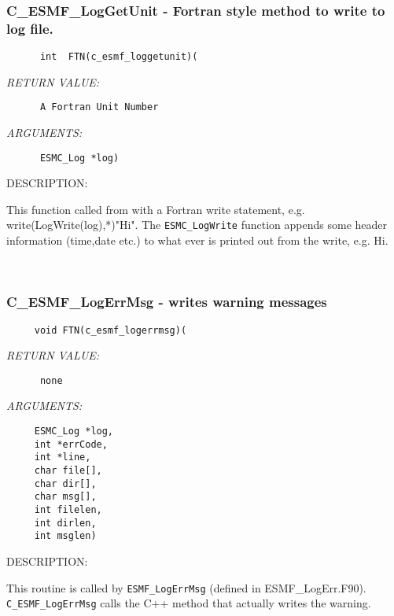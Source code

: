   \subsubsection [C\_ESMF\_LogGetUnit] {C\_ESMF\_LogGetUnit - Fortran style method to write to log file.}


  
\begin{verbatim}      int  FTN(c_esmf_loggetunit)(\end{verbatim}{\em RETURN VALUE:}
\begin{verbatim}      A Fortran Unit Number\end{verbatim}{\em ARGUMENTS:}
\begin{verbatim}      ESMC_Log *log)\end{verbatim}
{\sf DESCRIPTION:\\ }


      This function called from with a Fortran write statement, e.g.
      write(LogWrite(log),*)"Hi".  The {\tt ESMC\_LogWrite} function
      appends some
      header information (time,date etc.) to what ever is printed out
      from the write, e.g. Hi. 
 
\mbox{}\hrulefill\ 
 
\subsubsection [C\_ESMF\_LogErrMsg] {C\_ESMF\_LogErrMsg - writes warning messages}


  
\begin{verbatim}     void FTN(c_esmf_logerrmsg)(\end{verbatim}{\em RETURN VALUE:}
\begin{verbatim}      none\end{verbatim}{\em ARGUMENTS:}
\begin{verbatim}     ESMC_Log *log,
     int *errCode,
     int *line, 
     char file[],
     char dir[],
     char msg[], 
     int filelen,
     int dirlen,
     int msglen)\end{verbatim}
{\sf DESCRIPTION:\\ }


      This routine is called by {\tt ESMF\_LogErrMsg} (defined in ESMF\_LogErr.F90).  
      {\tt C\_ESMF\_LogErrMsg} calls the C++ method that actually writes
      the warning.
   

